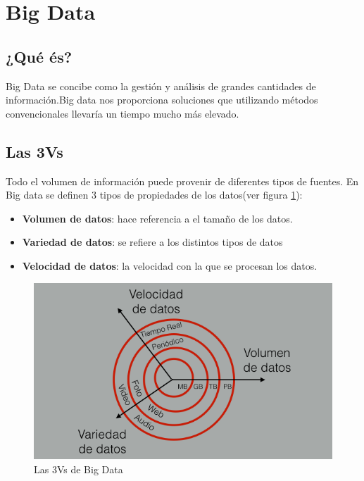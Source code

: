\section{Big Data}

\subsection{¿Qué és?}

Big Data se concibe como la gestión y análisis de grandes cantidades de información.Big data nos proporciona soluciones que utilizando métodos convencionales llevaría un tiempo mucho más elevado.

\subsection{Las 3Vs}

Todo el volumen de información puede provenir de diferentes tipos de fuentes. En Big data se definen 3 tipos de propiedades de los datos(ver figura \ref{3vs}):

\begin{itemize}

\item \textbf{Volumen de datos}: hace referencia a el tamaño de los datos.

\item \textbf{Variedad de datos}: se refiere a los distintos tipos de datos

\item \textbf{Velocidad de datos}: la velocidad con la que se procesan los datos.

\end{itemize}

\begin{figure}
\begin{center}
\includegraphics[width=1.0\textwidth]{imagenes/3V.png}
\caption{Las 3Vs de Big Data}
\label{3vs}
\end{center}
\end{figure}

